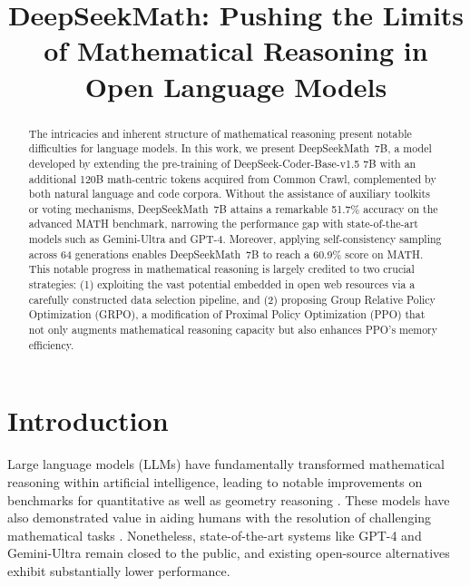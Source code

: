 \title{DeepSeekMath: Pushing the Limits of Mathematical Reasoning in Open Language Models}

\begin{abstract}
The intricacies and inherent structure of mathematical reasoning present notable difficulties for language models. In this work, we present DeepSeekMath~7B, a model developed by extending the pre-training of DeepSeek-Coder-Base-v1.5 7B with an additional 120B math-centric tokens acquired from Common Crawl, complemented by both natural language and code corpora. Without the assistance of auxiliary toolkits or voting mechanisms, DeepSeekMath~7B attains a remarkable 51.7\% accuracy on the advanced MATH benchmark, narrowing the performance gap with state-of-the-art models such as Gemini-Ultra and GPT-4. Moreover, applying self-consistency sampling across 64 generations enables DeepSeekMath~7B to reach a 60.9\% score on MATH. This notable progress in mathematical reasoning is largely credited to two crucial strategies: (1) exploiting the vast potential embedded in open web resources via a carefully constructed data selection pipeline, and (2) proposing Group Relative Policy Optimization (GRPO), a modification of Proximal Policy Optimization (PPO) that not only augments mathematical reasoning capacity but also enhances PPO’s memory efficiency.
\end{abstract}

\section{Introduction}

Large language models (LLMs) have fundamentally transformed mathematical reasoning within artificial intelligence, leading to notable improvements on benchmarks for quantitative \citep{MATH} as well as geometry reasoning \citep{trinh2024solving}. These models have also demonstrated value in aiding humans with the resolution of challenging mathematical tasks \citep{tao}. Nonetheless, state-of-the-art systems like GPT-4 \citep{gpt4} and Gemini-Ultra \citep{gemini} remain closed to the public, and existing open-source alternatives exhibit substantially lower performance.

